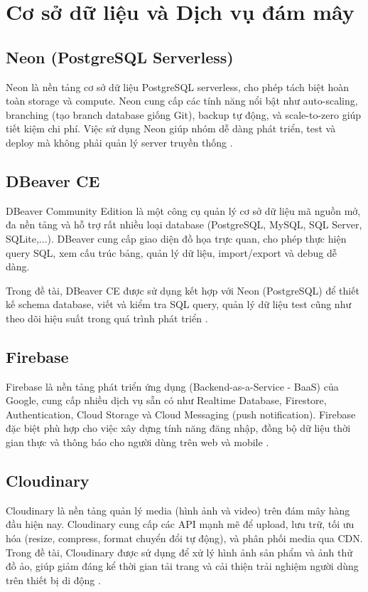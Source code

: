\section{Cơ sở dữ liệu và Dịch vụ đám mây}

\subsection{Neon (PostgreSQL Serverless)}
Neon là nền tảng cơ sở dữ liệu PostgreSQL serverless, cho phép tách biệt hoàn toàn storage và compute. Neon cung cấp các tính năng nổi bật như auto-scaling, branching (tạo branch database giống Git), backup tự động, và scale-to-zero giúp tiết kiệm chi phí. Việc sử dụng Neon giúp nhóm dễ dàng phát triển, test và deploy mà không phải quản lý server truyền thống \cite{neon_database}.

\subsection{DBeaver CE}
DBeaver Community Edition là một công cụ quản lý cơ sở dữ liệu mã nguồn mở, đa nền tảng và hỗ trợ rất nhiều loại database (PostgreSQL, MySQL, SQL Server, SQLite,...). DBeaver cung cấp giao diện đồ họa trực quan, cho phép thực hiện query SQL, xem cấu trúc bảng, quản lý dữ liệu, import/export và debug dễ dàng.

Trong đề tài, DBeaver CE được sử dụng kết hợp với Neon (PostgreSQL) để thiết kế schema database, viết và kiểm tra SQL query, quản lý dữ liệu test cũng như theo dõi hiệu suất trong quá trình phát triển \cite{dbeaver_docs}.

\subsection{Firebase}
Firebase là nền tảng phát triển ứng dụng (Backend-as-a-Service - BaaS) của Google, cung cấp nhiều dịch vụ sẵn có như Realtime Database, Firestore, Authentication, Cloud Storage và Cloud Messaging (push notification). Firebase đặc biệt phù hợp cho việc xây dựng tính năng đăng nhập, đồng bộ dữ liệu thời gian thực và thông báo cho người dùng trên web và mobile \cite{firebase_docs}.

\subsection{Cloudinary}
Cloudinary là nền tảng quản lý media (hình ảnh và video) trên đám mây hàng đầu hiện nay. Cloudinary cung cấp các API mạnh mẽ để upload, lưu trữ, tối ưu hóa (resize, compress, format chuyển đổi tự động), và phân phối media qua CDN. Trong đề tài, Cloudinary được sử dụng để xử lý hình ảnh sản phẩm và ảnh thử đồ ảo, giúp giảm đáng kể thời gian tải trang và cải thiện trải nghiệm người dùng trên thiết bị di động \cite{cloudinary_docs}.

